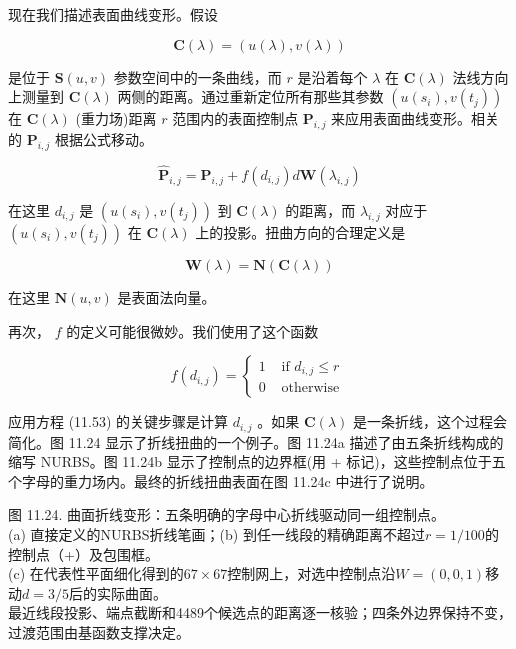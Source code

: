 \documentclass[../main.tex]{subfiles}
\begin{document}
现在我们描述表面曲线变形。假设

\[
\mathbf{C}\left( \lambda \right)  = \left( {u\left( \lambda \right) ,v\left( \lambda \right) }\right)  \tag{11.52}
\]

是位于 \(\mathbf{S}\left( {u,v}\right)\) 参数空间中的一条曲线，而 \(r\) 是沿着每个 \(\lambda\) 在 \(\mathbf{C}\left( \lambda \right)\) 法线方向上测量到 \(\mathbf{C}\left( \lambda \right)\) 两侧的距离。通过重新定位所有那些其参数 \(\left( {u\left( {s}_{i}\right) ,v\left( {t}_{j}\right) }\right)\) 在 \(\mathbf{C}\left( \lambda \right)\) (重力场)距离 \(r\) 范围内的表面控制点 \({\mathbf{P}}_{i,j}\) 来应用表面曲线变形。相关的 \({\mathbf{P}}_{i,j}\) 根据公式移动。

\[
{\widehat{\mathbf{P}}}_{i,j} = {\mathbf{P}}_{i,j} + f\left( {d}_{i,j}\right) d\mathbf{W}\left( {\lambda }_{i,j}\right)  \tag{11.53}
\]

在这里 \({d}_{i,j}\) 是 \(\left( {u\left( {s}_{i}\right) ,v\left( {t}_{j}\right) }\right)\) 到 \(\mathbf{C}\left( \lambda \right)\) 的距离，而 \({\lambda }_{i,j}\) 对应于 \(\left( {u\left( {s}_{i}\right) ,v\left( {t}_{j}\right) }\right)\) 在 \(\mathbf{C}\left( \lambda \right)\) 上的投影。扭曲方向的合理定义是

\[
\mathbf{W}\left( \lambda \right)  = \mathbf{N}\left( {\mathbf{C}\left( \lambda \right) }\right)  \tag{11.54}
\]

在这里 \(\mathbf{N}\left( {u,v}\right)\) 是表面法向量。



再次， \(f\) 的定义可能很微妙。我们使用了这个函数

\[
f\left( {d}_{i,j}\right)  = \left\{  \begin{array}{ll} 1 & \text{ if }{d}_{i,j} \leq  r \\  0 & \text{ otherwise } \end{array}\right.  \tag{11.55}
\]

应用方程 (11.53) 的关键步骤是计算 \({d}_{i,j}\) 。如果 \(\mathbf{C}\left( \lambda \right)\) 是一条折线，这个过程会简化。图 11.24 显示了折线扭曲的一个例子。图 11.24a 描述了由五条折线构成的缩写 NURBS。图 11.24b 显示了控制点的边界框(用 + 标记)，这些控制点位于五个字母的重力场内。最终的折线扭曲表面在图 11.24c 中进行了说明。


\begin{center}
\begin{minipage}{37cm}
\centering
{}
\par\medskip
{}
\par\smallskip
图 11.24. 曲面折线变形：五条明确的字母中心折线驱动同一组控制点。\\
(a) 直接定义的NURBS折线笔画；(b) 到任一线段的精确距离不超过$r=1/100$的控制点（+）及包围框。\\
(c) 在代表性平面细化得到的$67\times67$控制网上，对选中控制点沿$W=(0,0,1)$移动$d=3/5$后的实际曲面。\\
最近线段投影、端点截断和4489个候选点的距离逐一核验；四条外边界保持不变，过渡范围由基函数支撑决定。
\end{minipage}
\end{center}
\end{document}
